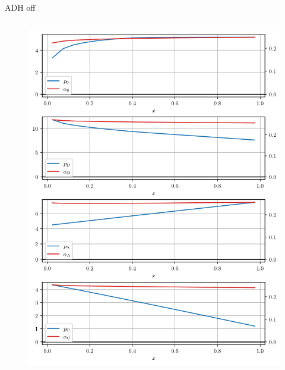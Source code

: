 \documentclass{beamer}
\begin{document}
\begin{frame}{ADH off}
    
\begin{columns}[T]

    \begin{column}{0.5\textwidth}
    \begin{figure}
        \centering
        \includegraphics[width=\textwidth]{results/4-7-2023/noADH_p_alpha.png}
    \end{figure}
    \end{column}
    

\end{columns}
\end{frame}
\end{document}
